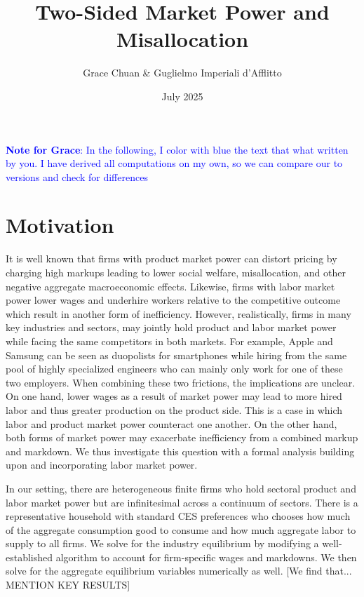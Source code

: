\documentclass[12pt]{article}%
\title{Two-Sided Market Power and Misallocation}
\author{Grace Chuan \& Guglielmo Imperiali d'Afflitto}
\date{July 2025}
\begin{document}
\maketitle



\textcolor{blue}{\textbf{Note for Grace}: In the following, I color with blue the text that what written by you. I have derived all computations on my own, so we can compare our to versions and check for differences}



\section{Motivation}
It is well known that firms with product market power can distort pricing by charging high markups leading to lower social welfare, misallocation, and other negative aggregate macroeconomic effects. Likewise, firms with labor market power lower wages and underhire workers relative to the competitive outcome which result in another form of inefficiency. However, realistically, firms in many key industries and sectors, may jointly hold product and labor market power while facing the same competitors in both markets. For example, Apple and Samsung can be seen as duopolists for smartphones while hiring from the same pool of highly specialized engineers who can mainly only work for one of these two employers. When combining these two frictions, the implications are unclear. On one hand, lower wages as a result of market power may lead to more hired labor and thus greater production on the product side. This is a case in which labor and product market power counteract one another. On the other hand, both forms of market power may exacerbate inefficiency from a combined markup and markdown. We thus investigate this question with a formal analysis building upon 
\citet{Atkeson-Burstein_2008} and incorporating labor market power. 

In our setting, there are heterogeneous finite firms who hold sectoral product and labor market power but are infinitesimal across a continuum of sectors. There is a representative household with standard CES preferences who chooses how much of the aggregate consumption good to consume and how much aggregate labor to supply to all firms. We solve for the industry equilibrium by modifying a well-established algorithm to account for firm-specific wages and markdowns. We then solve for the aggregate equilibrium variables numerically as well. [We find that... MENTION KEY RESULTS] 
\end{document}
